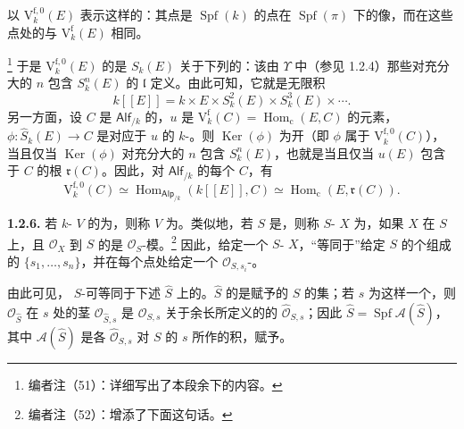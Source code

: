 以 $\mathrm V_k^{\mathrm f,0}(E)$ 表示这样的：其点是 $\operatorname{Spf}(k)$ 的点在 $\operatorname{Spf}(\pi)$ 下的像，而在这些点处的与 $\mathrm V_k^{\mathrm f}(E)$ 相同。

\footnote{编者注（51）：详细写出了本段余下的内容。}
于是 $\mathrm V_k^{\mathrm f,0}(E)$ 的是 $S_k(E)$ 关于下列的：该由 $\Upsilon$ 中（参见 1.2.4）那些对充分大的 $n$ 包含 $S_k^n(E)$ 的 $\mathfrak l$ 定义。由此可知，它就是无限积
\[
 k[[E]]=k\times E\times S_k^2(E)\times S_k^3(E)\times\cdots.
\]
另一方面，设 $C$ 是 $\mathsf{Alf}_{/k}$ 的，$u$ 是 $\mathrm V_k^{\mathrm f}(C)=\operatorname{Hom}_{\mathrm c}(E,C)$ 的元素，$\phi:\widehat S_k(E)\to C$ 是对应于 $u$ 的 $k$-。则 $\operatorname{Ker}(\phi)$ 为开（即 $\phi$ 属于 $\mathrm V_k^{\mathrm f,0}(C)$），当且仅当 $\operatorname{Ker}(\phi)$ 对充分大的 $n$ 包含
$S_k^n(E)$，也就是当且仅当 $u(E)$ 包含于 $C$ 的根 $\mathfrak r(C)$。因此，对 $\mathsf{Alf}_{/k}$ 的每个 $C$，有
\[
 \mathrm V_k^{\mathrm f,0}(C)\simeq\operatorname{Hom}_{\mathsf{Alp}_{/k}}(k[[E]],C)
 \simeq\operatorname{Hom}_{\mathrm c}(E,\mathfrak r(C)).
\]

\textbf{1.2.6.} 若 $k$- $V$ 的为，则称 $V$ 为。类似地，若 $S$ 是，则称 $S$- $X$ 为，如果 $X$ 在 $S$ 上，且 $\mathcal O_X$ 到 $S$ 的是 $\mathcal O_S$-模。\footnote{编者注（52）：增添了下面这句话。} 因此，给定一个 $S$- $X$，“等同于”给定 $S$ 的个组成的 $\{s_1,\ldots,s_n\}$，并在每个点处给定一个 $\mathcal O_{S,s_i}$-。

由此可见， $S$-可等同于下述 $\widehat S$ 上的。$\widehat S$ 的是赋予的 $S$ 的集；若 $s$ 为这样一个，则 $\mathcal O_{\widehat S}$ 在 $s$ 处的茎 $\mathcal O_{\widehat S,s}$ 是 $\mathcal O_{S,s}$ 关于余长所定义的的 $\widehat{\mathcal O}_{S,s}$；因此 $\widehat S=\operatorname{Spf}\mathscr A(\widehat S)$，其中 $\mathscr A(\widehat S)$ 是各 $\widehat{\mathcal O}_{S,s}$ 对 $S$ 的 $s$ 所作的积，赋予。

